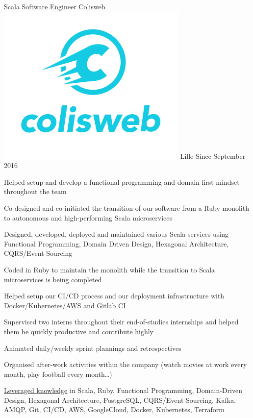 \documentclass[12pt, a4paper]{awesome-cv}
\begin{document}
    \makecvheader


        \begin{cventries}

            \cventry
                {Scala Software Engineer}
                {Colisweb ~~ \includegraphics[scale=0.085]{images/logo_colisweb}}
                {Lille}
                {Since September 2016}
                {
                    \begin{cvitems}
                        \item {Helped setup and develop a functional programming and domain-first mindset throughout the team}
                        \item {Co-designed and co-initiated the transition of our software from a Ruby monolith to autonomous and high-performing Scala microservices}
                        \item {Designed, developed, deployed and maintained various Scala services using Functional Programming, Domain Driven Design, Hexagonal Architecture, CQRS/Event Sourcing}
                        \item {Coded in Ruby to maintain the monolith while the transition to Scala microservices is being completed}
                        \item {Helped setup our CI/CD process and our deployment infrastructure with Docker/Kubernetes/AWS and Gitlab CI}
                        \item {Supervised two interns throughout their end-of-studies internships and helped them be quickly productive and contribute highly}
                        \item {Animated daily/weekly sprint plannings and retrospectives}
                        \item {Organised after-work activities within the company (watch movies at work every month, play football every month\ldots)}
                        \item {\underline{Leveraged knowledge} in Scala, Ruby, Functional Programming, Domain-Driven Design, Hexagonal Architecture, PostgreSQL, CQRS/Event Sourcing, Kafka, AMQP, Git, CI/CD, AWS, GoogleCloud, Docker, Kubernetes, Terraform}
                    \end{cvitems}
                }


\end{cventries}
\end{document}
